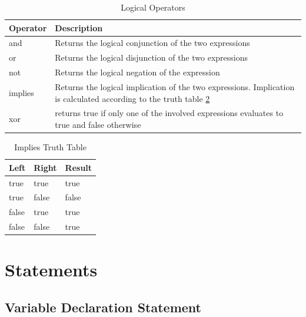 \begin{longtable} {|p{5.5cm}|p{6.5cm}|}
			
			\caption{Logical Operators}
			\label{tab:LogicalOperators}\\
			
			\hline
							
			\textbf{Operator} & \textbf{Description} \\\hline

			and & Returns the logical conjunction of the two expressions \\\hline
			
			or & Returns the logical disjunction of the two expressions \\\hline
			
			not & Returns the logical negation of the expression \\\hline
			
			implies & Returns the logical implication of the two expressions. Implication is calculated according to the truth table \ref{tab:ImpliesTruthTable} \\\hline
			
			xor & returns true if only one of the involved expressions evaluates to true  and false otherwise \\\hline
	
\end{longtable}
	
\begin{longtable} {|l|l|l|} 
	
	\caption{Implies Truth Table}
	\label{tab:ImpliesTruthTable}\\
	
	\hline
		\textbf{Left} & \textbf{Right} & \textbf{Result} \\\hline
		true & true & true \\\hline
		true & false & false \\\hline
		false & true & true \\\hline
		false & false & true \\\hline			

\end{longtable}

\section{Statements}

\subsection{Variable Declaration Statement}

